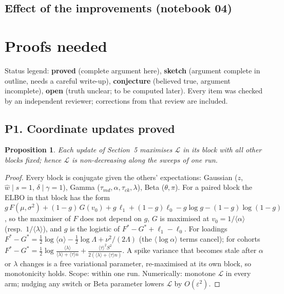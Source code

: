 \documentclass[11pt,a4paper]{article}
\newcommand{\ELBO}{\mathcal{L}}
\newcommand{\wh}{\hat w}
\newcommand{\RESTABLES}{}
\newtheorem{proposition}{Proposition}
\theoremstyle{definition}
\theoremstyle{remark}
\begin{document}
\subsection{Effect of the improvements (notebook 04)}
\RESTABLES

\section{Proofs needed}\label{sec:proofs}
Status legend: \textbf{proved} (complete argument here), \textbf{sketch} (argument complete in outline, needs a careful
write-up), \textbf{conjecture} (believed true, argument incomplete), \textbf{open} (truth unclear; to be computed later).
Every item was checked by an independent reviewer; corrections from that review are included.

\subsection*{P1. Coordinate updates \hfill\textbf{proved}}
\begin{proposition}\label{prop:cavi}
Each update of Section~5 maximises $\ELBO$ in its block with all other blocks fixed; hence $\ELBO$ is non-decreasing along
the sweeps of one run.
\end{proposition}
\begin{proof}
Every block is conjugate given the others' expectations: Gaussian ($z$, $\wh\mid s=1$, $\delta\mid\gamma=1$), Gamma
($\tau_{md},\alpha,\tau_{ck},\lambda$), Beta ($\theta,\pi$). For a paired block the ELBO in that block has the form
$g\,F(\mu,\sigma^2)+(1-g)\,G(v_0)+g\,\ell_1+(1-g)\ell_0-g\log g-(1-g)\log(1-g)$, so the maximiser of $F$ does not depend on $g$,
$G$ is maximised at $v_0=1/\langle\alpha\rangle$ (resp.\ $1/\langle\lambda\rangle$), and $g$ is the logistic of $F^\ast-G^\ast+\ell_1-\ell_0$. For
loadings $F^\ast-G^\ast=\tfrac12\log\langle\alpha\rangle-\tfrac12\log\Lambda+\nu^2/(2\Lambda)$ (the $\langle\log\alpha\rangle$ terms cancel); for
cohorts $F^\ast-G^\ast=\tfrac12\log\frac{\langle\lambda\rangle}{\langle\lambda\rangle+\langle\tau\rangle n}+\frac{\langle\tau\rangle^2S^2}{2(\langle\lambda\rangle+\langle\tau\rangle n)}$. A
spike variance that becomes stale after $\alpha$ or $\lambda$ changes is a free variational parameter, re-maximised at its
own block, so monotonicity holds. Scope: within one run. Numerically: monotone $\ELBO$ in every arm; nudging any switch
or Beta parameter lowers $\ELBO$ by $O(\varepsilon^2)$. \qedhere
\end{proof}
\end{document}
